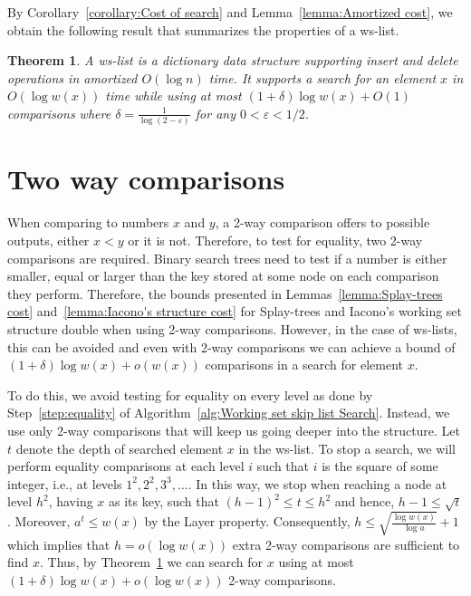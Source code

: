 \documentclass[11pt]{article}       %
\newtheorem{theorem}{Theorem}
\newcommand{\wlist}{ws-list\xspace}
\newcommand{\wlists}{ws-lists\xspace}
\newcommand{\layer}{Layer property\xspace}
\begin{document}
By Corollary~\ref{corollary:Cost of search} and Lemma~\ref{lemma:Amortized cost}, we obtain the following result that summarizes the properties of a \wlist.

\begin{theorem}\label{theorem:Summary of properties}
A \wlist is a dictionary data structure supporting insert and delete operations in amortized $O(\log n)$ time. It supports a search for an element $x$ in $O(\log w(x))$ time while using at most $(1+\delta)\log w(x) + O(1)$ comparisons where $\delta = \frac{1}{\log (2-\varepsilon)}$ for any $0<\varepsilon < 1/2$.
\end{theorem}

\section{Two way comparisons}\label{section:2-way comparisons}
When comparing to numbers $x$ and $y$, a 2-way comparison offers to possible outputs, either $x<y$ or it is not. Therefore, to test for equality, two 2-way comparisons are required. Binary search trees need to test if a number is either smaller, equal or larger than the key stored at some node on each comparison they perform. Therefore, the bounds presented in Lemmas~\ref{lemma:Splay-trees cost} and~\ref{lemma:Iacono's structure cost} for Splay-trees and Iacono's working set structure double when using 2-way comparisons. However, in the case of \wlists, this can be avoided and even with 2-way comparisons we can achieve a bound of $(1+\delta) \log w(x) + o(w(x))$ comparisons in a search for element $x$.

To do this, we avoid testing for equality on every level as done by Step~\ref{step:equality} of Algorithm~\ref{alg:Working set skip list Search}. Instead, we use only 2-way comparisons that will keep us going deeper into the structure. 
Let $t$ denote the depth of searched element $x$ in the \wlist.
To stop a search, we will perform equality comparisons at each level $i$ such that $i$ is the square of some integer, i.e., at levels $1^2, 2^2, 3^3, \ldots$. 
In this way, we stop when reaching a node at level $h^2$, having $x$ as its key, such that $(h-1)^2 \leq t \leq h^2$ and hence, $ h-1 \leq \sqrt{t}$. Moreover, $a^t \leq w(x)$ by the \layer.
Consequently, $h \leq \sqrt{\frac{\log w(x)}{\log a}} + 1$ which implies that $h = o(\log w(x))$ extra 2-way comparisons are sufficient to find $x$. Thus, by Theorem~\ref{theorem:Summary of properties} we can search for $x$ using at most $(1+\delta)\log w(x) +o(\log w(x))$ 2-way comparisons.
\end{document}
